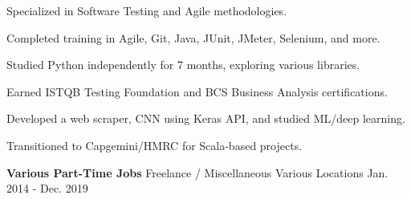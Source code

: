 \begin{cventries}
    {
      \begin{sloppypar}  
      \begin{cvitems}
        \item {Specialized in Software Testing and Agile methodologies.}
        \item {Completed training in Agile, Git, Java, JUnit, JMeter, Selenium, and more.}
        \item {Studied Python independently for 7 months, exploring various libraries.}
        \item {Earned ISTQB Testing Foundation and BCS Business Analysis certifications.}
        \item {Developed a web scraper, CNN using Keras API, and studied ML/deep learning.}
        \item {Transitioned to Capgemini/HMRC for Scala-based projects.}
      \end{cvitems}
      \end{sloppypar}
    }    

\cventry
    {\textbf{Various Part-Time Jobs}} 
    {Freelance / Miscellaneous} 
    {Various Locations} 
    {Jan. 2014 - Dec. 2019}
    {}      

\end{cventries}
